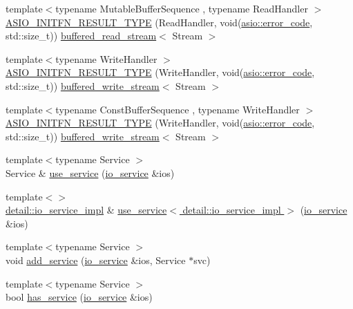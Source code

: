 \begin{DoxyCompactItemize}
\item 
{\footnotesize template$<$typename Mutable\+Buffer\+Sequence , typename Read\+Handler $>$ }\\\hyperlink{namespaceasio_ae7deb94f1e4f209ff535c2fd9ac06ba8}{A\+S\+I\+O\+\_\+\+I\+N\+I\+T\+F\+N\+\_\+\+R\+E\+S\+U\+L\+T\+\_\+\+T\+Y\+P\+E} (Read\+Handler, void(\hyperlink{classasio_1_1error__code}{asio\+::error\+\_\+code}, std\+::size\+\_\+t)) \hyperlink{classasio_1_1buffered__read__stream}{buffered\+\_\+read\+\_\+stream}$<$ Stream $>$
\item 
{\footnotesize template$<$typename Write\+Handler $>$ }\\\hyperlink{namespaceasio_a83cc551c7151133f0292ec21e4d08647}{A\+S\+I\+O\+\_\+\+I\+N\+I\+T\+F\+N\+\_\+\+R\+E\+S\+U\+L\+T\+\_\+\+T\+Y\+P\+E} (Write\+Handler, void(\hyperlink{classasio_1_1error__code}{asio\+::error\+\_\+code}, std\+::size\+\_\+t)) \hyperlink{classasio_1_1buffered__write__stream}{buffered\+\_\+write\+\_\+stream}$<$ Stream $>$
\item 
{\footnotesize template$<$typename Const\+Buffer\+Sequence , typename Write\+Handler $>$ }\\\hyperlink{namespaceasio_aae155d327b1f08e08ca04fad48cf39b9}{A\+S\+I\+O\+\_\+\+I\+N\+I\+T\+F\+N\+\_\+\+R\+E\+S\+U\+L\+T\+\_\+\+T\+Y\+P\+E} (Write\+Handler, void(\hyperlink{classasio_1_1error__code}{asio\+::error\+\_\+code}, std\+::size\+\_\+t)) \hyperlink{classasio_1_1buffered__write__stream}{buffered\+\_\+write\+\_\+stream}$<$ Stream $>$
\item 
{\footnotesize template$<$typename Service $>$ }\\Service \& \hyperlink{namespaceasio_af58b7928a252af75bd55864260c19685}{use\+\_\+service} (\hyperlink{classasio_1_1io__service}{io\+\_\+service} \&ios)
\item 
{\footnotesize template$<$$>$ }\\\hyperlink{namespaceasio_1_1detail_a6d61d9b8e53c11288be549d82aec5a42}{detail\+::io\+\_\+service\+\_\+impl} \& \hyperlink{namespaceasio_abc0262ce1729113b74df9d11992c95d6}{use\+\_\+service$<$ detail\+::io\+\_\+service\+\_\+impl $>$} (\hyperlink{classasio_1_1io__service}{io\+\_\+service} \&ios)
\item 
{\footnotesize template$<$typename Service $>$ }\\void \hyperlink{namespaceasio_acb48bc8e931affee7ab772dd7706bb74}{add\+\_\+service} (\hyperlink{classasio_1_1io__service}{io\+\_\+service} \&ios, Service $\ast$svc)
\item 
{\footnotesize template$<$typename Service $>$ }\\bool \hyperlink{namespaceasio_ae99c6070cedcd4c0ba471a8e41f66e9f}{has\+\_\+service} (\hyperlink{classasio_1_1io__service}{io\+\_\+service} \&ios)

\end{DoxyCompactItemize}
